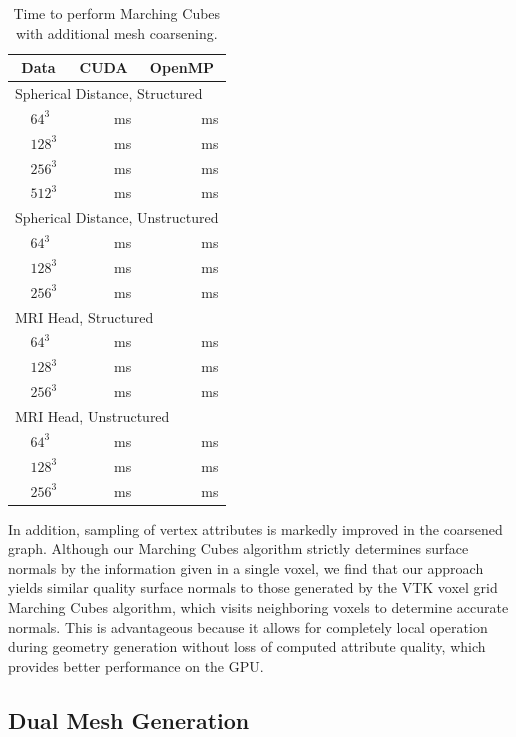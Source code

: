 \documentclass[10pt,journal,cspaper,compsoc]{IEEEtran}
\begin{document}
\begin{table}[htb]
  \centering
  \caption{Time to perform Marching Cubes with additional mesh coarsening.}
  \label{table:Coarsening}
  \begin{tabular}{l l r r}
    \multicolumn{2}{c}{Data}
    & \multicolumn{1}{c}{CUDA}
    & \multicolumn{1}{c}{OpenMP} \\
    \hline
    \multicolumn{4}{l}{Spherical Distance, Structured} \\
    \quad
    & $64^3$ &  ms &  ms \\
    & $128^3$ &  ms &  ms \\
    & $256^3$ &  ms &  ms \\
    & $512^3$ &  ms &  ms \\
    \multicolumn{4}{l}{Spherical Distance, Unstructured} \\
    & $64^3$ &  ms &  ms \\
    & $128^3$ &  ms &  ms \\
    & $256^3$ &  ms &  ms \\
    \multicolumn{4}{l}{MRI Head, Structured} \\
    & $64^3$ &  ms &  ms \\
    & $128^3$ &  ms &  ms \\
    & $256^3$ &  ms &  ms \\
    \multicolumn{4}{l}{MRI Head, Unstructured} \\
    & $64^3$ &  ms &  ms \\
    & $128^3$ &  ms &  ms \\
    & $256^3$ &  ms &  ms
  \end{tabular}
\end{table}

In addition, sampling of vertex attributes is markedly improved in the
coarsened graph. Although our Marching Cubes algorithm strictly determines
surface normals by the information given in a single voxel, we find that
our approach yields similar quality surface normals to those generated by
the VTK voxel grid Marching Cubes algorithm, which visits neighboring
voxels to determine accurate normals. This is advantageous because it
allows for completely local operation during geometry generation without
loss of computed attribute quality, which provides better performance on
the GPU.

\subsection{Dual Mesh Generation}
\end{document}
